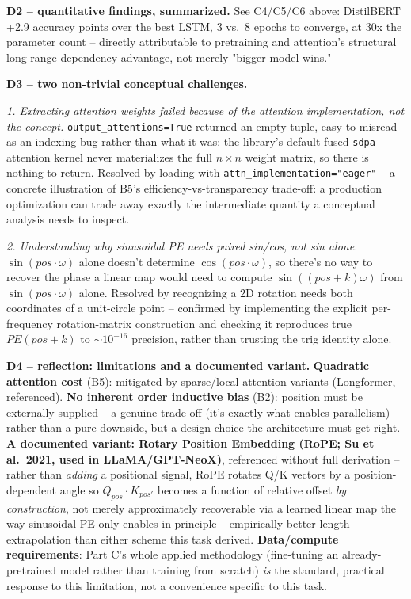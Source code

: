 \documentclass[11pt,a4paper]{article}
\begin{document}
\textbf{D2 -- quantitative findings, summarized.} See C4/C5/C6 above: DistilBERT +2.9
accuracy points over the best LSTM, 3 vs.\ 8 epochs to converge, at 30x the parameter count --
directly attributable to pretraining and attention's structural long-range-dependency
advantage, not merely "bigger model wins."

\textbf{D3 -- two non-trivial conceptual challenges.}

\emph{1. Extracting attention weights failed because of the attention \emph{implementation},
not the concept.} \texttt{output\_attentions=True} returned an empty tuple, easy to misread
as an indexing bug rather than what it was: the library's default fused \texttt{sdpa}
attention kernel never materializes the full $n\times n$ weight matrix, so there is nothing to
return. Resolved by loading with \texttt{attn\_implementation="eager"} -- a concrete
illustration of B5's efficiency-vs-transparency trade-off: a production optimization can trade
away exactly the intermediate quantity a conceptual analysis needs to inspect.

\emph{2. Understanding why sinusoidal PE needs \emph{paired} sin/cos, not sin alone.}
$\sin(pos\cdot\omega)$ alone doesn't determine $\cos(pos\cdot\omega)$, so there's no way to
recover the phase a linear map would need to compute $\sin((pos{+}k)\omega)$ from
$\sin(pos\cdot\omega)$ alone. Resolved by recognizing a $2$D rotation needs both coordinates
of a unit-circle point -- confirmed by implementing the explicit per-frequency rotation-matrix
construction and checking it reproduces true $PE(pos{+}k)$ to $\sim10^{-16}$ precision, rather
than trusting the trig identity alone.

\textbf{D4 -- reflection: limitations and a documented variant.} \textbf{Quadratic attention
cost} (B5): mitigated by sparse/local-attention variants (Longformer, referenced). \textbf{No
inherent order inductive bias} (B2): position must be externally supplied -- a genuine
trade-off (it's exactly what enables parallelism) rather than a pure downside, but a design
choice the architecture must get right. \textbf{A documented variant: Rotary Position
Embedding (RoPE; Su et al.\ 2021, used in LLaMA/GPT-NeoX)}, referenced without full
derivation -- rather than \emph{adding} a positional signal, RoPE rotates Q/K vectors by a
position-dependent angle so $Q_{pos}\cdot K_{pos'}$ becomes a function of relative offset
\emph{by construction}, not merely approximately recoverable via a learned linear map the way
sinusoidal PE only enables in principle -- empirically better length extrapolation than either
scheme this task derived. \textbf{Data/compute requirements}: Part C's whole applied
methodology (fine-tuning an already-pretrained model rather than training from scratch) \emph{is}
the standard, practical response to this limitation, not a convenience specific to this task.
\end{document}
